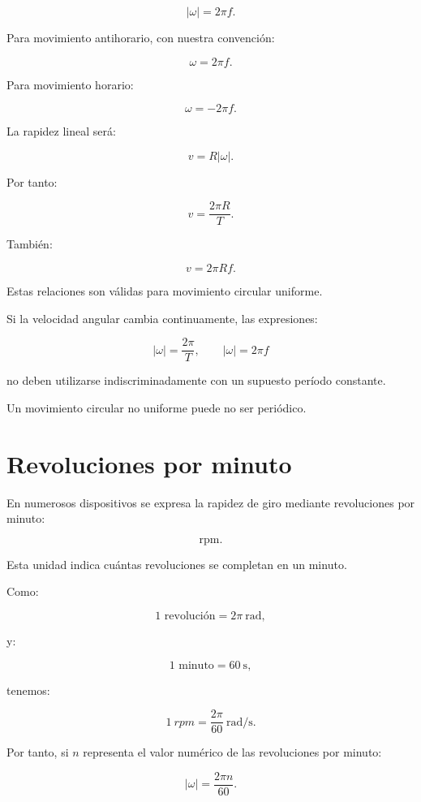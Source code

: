 \[
\boxed{
|\omega|=2\pi f
}.
\]

Para movimiento antihorario, con nuestra convención:

\[
\omega=2\pi f.
\]

Para movimiento horario:

\[
\omega=-2\pi f.
\]

La rapidez lineal será:

\[
v=R|\omega|.
\]

Por tanto:

\[
\boxed{
v=\frac{2\pi R}{T}
}.
\]

También:

\[
\boxed{
v=2\pi Rf
}.
\]

Estas relaciones son válidas para movimiento circular uniforme.

\begin{advertencia}

Si la velocidad angular cambia continuamente, las expresiones:

\[
|\omega|=\frac{2\pi}{T},
\qquad
|\omega|=2\pi f
\]

no deben utilizarse indiscriminadamente con un supuesto período constante.

Un movimiento circular no uniforme puede no ser periódico.

\end{advertencia}


\section{Revoluciones por minuto}

En numerosos dispositivos se expresa la rapidez de giro mediante
revoluciones por minuto:

\[
\mathrm{rpm}.
\]

Esta unidad indica cuántas revoluciones se completan en un minuto.

Como:

\[
1\text{ revolución}=2\pi\ \si{\radian},
\]

y:

\[
1\text{ minuto}=\SI{60}{\second},
\]

tenemos:

\[
\boxed{
\SI{1}{rpm}
=
\frac{2\pi}{60}
\ \si{\radian\per\second}
}.
\]

Por tanto, si \(n\) representa el valor numérico de las revoluciones por
minuto:

\[
\boxed{
|\omega|
=
\frac{2\pi n}{60}
}.
\]

